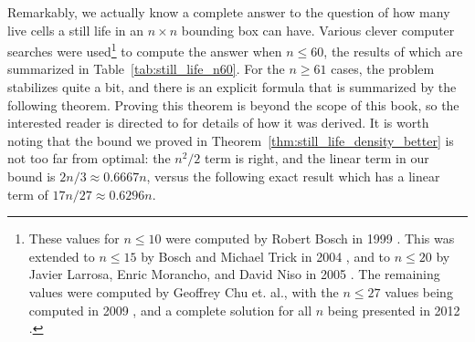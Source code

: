 Remarkably, we actually know a complete answer to the question of how many live cells a still life in an $n \times n$ bounding box can have. Various clever computer searches were used\footnote{These values for $n \leq 10$ were computed by Robert Bosch in 1999 \cite{Bos99}. This was extended to $n \leq 15$ by Bosch and Michael Trick in 2004 \cite{BT04}, and to $n \leq 20$ by Javier Larrosa, Enric Morancho, and David Niso in 2005 \cite{LMN05}. The remaining values were computed by Geoffrey Chu et. al., with the $n \leq 27$ values being computed in 2009 \cite{CSB09}, and a complete solution for all $n$ being presented in 2012 \cite{CS12}.} to compute the answer when $n \leq 60$, the results of which are summarized in Table~\ref{tab:still_life_n60}. For the $n \geq 61$ cases, the problem stabilizes quite a bit, and there is an explicit formula that is summarized by the following theorem. Proving this theorem is beyond the scope of this book, so the interested reader is directed to \cite{CS12} for details of how it was derived. It is worth noting that the bound we proved in Theorem~\ref{thm:still_life_density_better} is not too far from optimal: the $n^2/2$ term is right, and the linear term in our bound is $2n/3 \approx 0.6667n$, versus the following exact result which has a linear term of $17n/27 \approx 0.6296n$.

